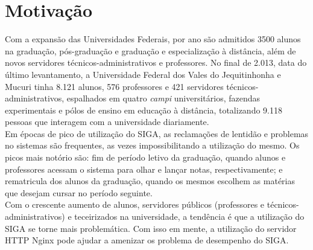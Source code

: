 \section{Motivação}
Com a expansão das Universidades Federais, por ano são admitidos 3500 alunos na 
graduação, pós-graduação e graduação e especialização à distância, além de 
novos servidores técnicos-administrativos e professores. No final de 2.013, 
data do último levantamento, a Universidade Federal dos Vales do Jequitinhonha 
e Mucuri tinha 8.121 alunos, 576 professores e 421 servidores 
técnicos-administrativos, espalhados em quatro \textit{campi} universitários, 
fazendas experimentais e pólos de ensino em educação à distância, totalizando 
9.118 pessoas que interagem com a universidade diariamente.\\
Em épocas de pico de utilização do SIGA, as reclamações de lentidão e problemas no sistemas são frequentes, as vezes impossibilitando a utilização do mesmo. Os picos mais notório são: fim de período letivo da graduação, quando alunos e professores acessam o sistema para olhar e lançar notas, respectivamente; e rematricula dos alunos da graduação, quando os mesmos escolhem as matérias que desejam cursar no período seguinte.\\
Com o crescente aumento de alunos, servidores públicos (professores e técnicos-administrativos) e teceirizados na universidade, a tendência é que a utilização do SIGA se torne mais problemática.
Com isso em mente, a utilização do servidor HTTP Nginx pode ajudar a amenizar os problema de desempenho do SIGA.\\
